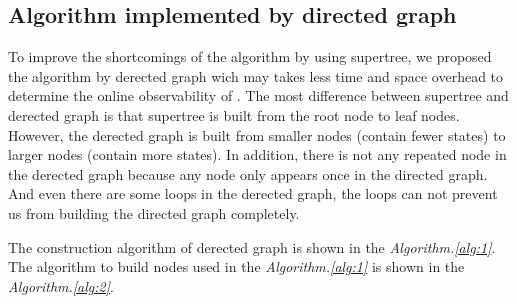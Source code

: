 \subsection{Algorithm implemented by directed graph}
To improve the shortcomings of the algorithm by using supertree, we proposed the algorithm by derected graph wich may takes less time and space overhead to determine the online observability of \BCNs. The most difference between supertree and derected graph is that supertree is built from the root node to leaf nodes. However, the derected graph is built from smaller nodes (contain fewer states) to larger nodes (contain more states). In addition, there is not any repeated node in the derected graph because any node only appears once in the directed graph. And even there are some loops in the derected graph, the loops can not prevent us from building the directed graph completely.

The construction algorithm of derected graph is shown in the {\em Algorithm.\ref{alg:1}}. The algorithm to build nodes used in the {\em Algorithm.\ref{alg:1}} is shown in the {\em Algorithm.\ref{alg:2}}.

